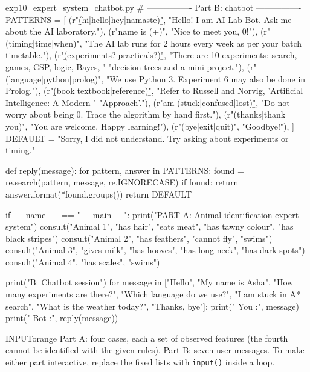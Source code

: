 \documentclass[11pt,a4paper]{article}
\newenvironment{inputbox}{\begin{secbox}{INPUT}{orange}}{\end{secbox}}
\begin{document}
\begin{pycode}{exp10\_expert\_system\_chatbot.py}
# ---------------- Part B: chatbot ----------------
PATTERNS = [
    (r"\b(hi|hello|hey|namaste)\b",
     "Hello! I am AI-Lab Bot. Ask me about the AI laboratory."),
    (r"\bmy name is (\w+)", "Nice to meet you, {0}!"),
    (r"\b(timing|time|when)\b",
     "The AI lab runs for 2 hours every week as per your batch timetable."),
    (r"\b(experiments?|practicals?)\b",
     "There are 10 experiments: search, games, CSP, logic, Bayes, "
     "decision trees and a mini-project."),
    (r"\b(language|python|prolog)\b",
     "We use Python 3. Experiment 6 may also be done in Prolog."),
    (r"\b(book|textbook|reference)\b",
     "Refer to Russell and Norvig, 'Artificial Intelligence: A Modern "
     "Approach'."),
    (r"\bi am (stuck|confused|lost)\b",
     "Do not worry about being {0}. Trace the algorithm by hand first."),
    (r"\b(thanks|thank you)\b", "You are welcome. Happy learning!"),
    (r"\b(bye|exit|quit)\b", "Goodbye!"),
]
DEFAULT = "Sorry, I did not understand. Try asking about experiments or timing."


def reply(message):
    for pattern, answer in PATTERNS:
        found = re.search(pattern, message, re.IGNORECASE)
        if found:
            return answer.format(*found.groups())
    return DEFAULT


if __name__ == "__main__":
    print("PART A: Animal identification expert system")
    consult("Animal 1", {"has hair", "eats meat", "has tawny colour",
                         "has black stripes"})
    consult("Animal 2", {"has feathers", "cannot fly", "swims"})
    consult("Animal 3", {"gives milk", "has hooves", "has long neck",
                         "has dark spots"})
    consult("Animal 4", {"has scales", "swims"})

    print("\nPART B: Chatbot session")
    for message in ["Hello", "My name is Asha", "How many experiments are there?",
                    "Which language do we use?", "I am stuck in A* search",
                    "What is the weather today?", "Thanks, bye"]:
        print("   You :", message)
        print("   Bot :", reply(message))
\end{pycode}

\begin{inputbox}
Part A: four cases, each a set of observed features (the fourth cannot be identified with the given rules). Part B: seven user messages. To make either part interactive, replace the fixed lists with \texttt{input()} inside a loop.
\end{inputbox}
\end{document}
